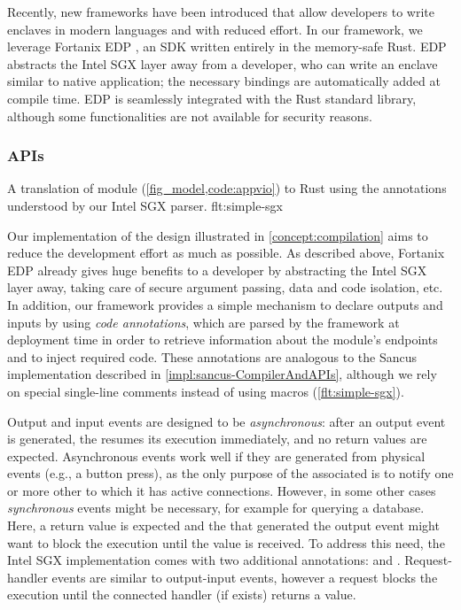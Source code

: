 Recently, new frameworks have been introduced that allow developers to write
enclaves in modern languages and with reduced effort. In our framework, we
leverage Fortanix \ac{EDP} \cite{fortanix-edp}, an SDK written entirely in the
memory-safe Rust. \ac{EDP} abstracts the Intel \ac{SGX} layer away
from a developer, who can write an enclave similar to native application; the
necessary bindings are automatically added at compile time.
\ac{EDP} is seamlessly integrated with the Rust standard library, although some
functionalities are not available for security reasons.

\subsubsection{APIs}

%
  {}{}%
  {A translation of module  (\cref{fig_model,code:appvio}) to Rust
using the annotations understood by our Intel \ac{SGX} parser.}%
  {flt:simple-sgx}

Our implementation of the design illustrated in \cref{concept:compilation} aims
to reduce the development effort as much as possible. As described above,
Fortanix \ac{EDP} already gives huge benefits to a developer by abstracting the
Intel \ac{SGX} layer away, taking care of secure argument passing,
data and code isolation, etc. In addition, our framework provides a
simple mechanism to declare outputs and inputs by using \emph{code annotations},
which are parsed by the framework at deployment time in order to retrieve
information about the module's endpoints and to inject required code. These
annotations are analogous to the Sancus implementation described in
\cref{impl:sancus-CompilerAndAPIs}, although we rely on special single-line
comments instead of using macros (\cref{flt:simple-sgx}).

Output and input events are designed to be \emph{asynchronous}: after an output
event is generated, the \protmod{} resumes its execution immediately, and no
return values are expected. Asynchronous events work well if they are generated
from physical events (e.g., a button press), as the only purpose of the
associated \protmod{} is to notify one or more other \protmods{} to which it has
active connections. However, in some other cases \emph{synchronous} events might
be necessary, for example for querying a database. Here, a return value is
expected and the \protmod{} that generated the output event might want to block
the execution until the value is received. To address this need, the Intel
\ac{SGX} implementation comes with two additional annotations:  and . Request-handler events are similar to
output-input events, however a request blocks the execution until the connected
handler (if exists) returns a value.

